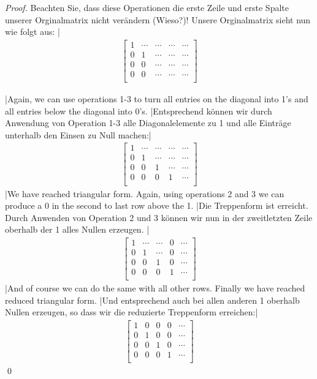 \begin{proof}
   Beachten Sie, dass diese Operationen die erste Zeile und erste Spalte unserer Orginalmatrix nicht verändern (Wieso?)! Unsere Orginalmatrix sieht nun wie folgt aus: |
\begin{eqnarray*}
\left[\begin{array}{rrrr|r}
1& \cdots&\cdots&\cdots&\cdots\\
0&1&\cdots&\cdots&\cdots\\
0&0&\cdots&\cdots&\cdots\\
0&0&\cdots&\cdots&\cdots\\
\end{array}\right]
\end{eqnarray*}

\tr|Again, we can use operations 1-3 to turn all entries on the diagonal into 1's and all entries below the diagonal into 0's.
   |Entsprechend können wir durch Anwendung von Operation 1-3 alle Diagonalelemente zu 1 und alle Einträge unterhalb den Einsen zu Null machen:|
\begin{eqnarray*}
\left[\begin{array}{rrrr|r}
1& \cdots&\cdots&\cdots&\cdots\\
0&1&\cdots&\cdots&\cdots\\
0&0&1&\cdots&\cdots\\
0&0&0&1&\cdots\\
\end{array}\right]
\end{eqnarray*}
\tr|We have reached triangular form. Again, using operations 2 and 3 we can produce a 0 in the second to last row above the 1. 
   |Die Treppenform ist erreicht. Durch Anwenden von Operation 2 und 3 können wir nun in der zweitletzten Zeile oberhalb der 1 alles Nullen erzeugen. |
\begin{eqnarray*}
\left[\begin{array}{rrrr|r}
1& \cdots&\cdots&0&\cdots\\
0&1&\cdots&0&\cdots\\
0&0&1&0&\cdots\\
0&0&0&1&\cdots\\
\end{array}\right]
\end{eqnarray*}
\tr|And of course we can do the same with all other rows. Finally we have reached reduced triangular form.
   |Und entsprechend auch bei allen anderen 1 oberhalb Nullen erzeugen, so dass wir die reduzierte Treppenform erreichen:|
\begin{eqnarray*}
\left[\begin{array}{rrrr|r}
1&0&0&0&\cdots\\
0&1&0&0&\cdots\\
0&0&1&0&\cdots\\
0&0&0&1&\cdots\\
\end{array}\right]
\end{eqnarray*}
\qed
\end{proof}

